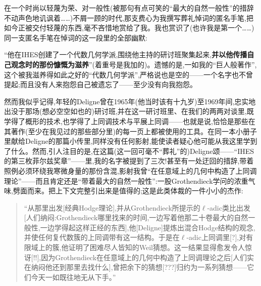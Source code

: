 在一个时尚以轻蔑为荣、对一般性(被那句有点可笑的“最大的自然一般性”的措辞不动声色地讥讽着……)不屑一顾的时代,\dmark{}那支费心为我撰写葬礼悼词的匿名手笔,把如今正被交付轻蔑的东西\dmark{},毫不吝惜地赏给了我。我也赏识了(也许我是第一个……)同一支匿名手笔在悼词的这一段里的全部幽默:

“他在IHES创建了一个代数几何学派,围绕他主持的研讨班聚集起来,\textbf{并以他传播自己观念时的那份慷慨为滋养}”(着重号是我加的)。遗憾的是,一如我的“巨人般著作”,这个被我滋养得如此之好的“代数几何学派”,严格说也是空的——一个名字也不曾提起;而且没有人来抱怨自己被遗忘了——至少没有向我抱怨。

然而我似乎记得,年轻的Deligne曾在1965年(他当时该有十九岁)至1969年间,忠实地出没于那场(想必空空如也的)研讨班,并在这一研讨班里、在我们的两两对谈里,既学得了概形的技术,也学得了上同调技术与平展上同调——也就是说,恰恰是那些在其著作(至少在我见过的那些部分里)的每一页上都被使用的工具。在同一本小册子里献给Deligne的那篇小传里,同样没有任何影射,能使读者疑心\dmark{}他可能从我这里学到了什么。然而,引人注目的是,在这篇(这一回可毫不“葬礼”的)Deligne颂——“IHES的第三枚菲尔兹奖章”——里,我的名字被提到了三次!甚至有一处迂回的措辞,带着照例必须环绕我寒微身量的那份含混,影射我曾“在任意域上的几何中构造了上同调理论”——而且肯定还是“带着最大的自然一般性”:一股Grothendieck学问的浓重气味,劈面而来。把上下文完整引出来是值得的;这是此类体裁的一件小小的杰作:

\begin{quote}
“从那里出发[经典Hodge理论],并从Grothendieck所提示的$\ell$-adic类比出发[人们纳闷:Grothendieck哪里找来的时间,一边写着他那二十卷最大的自然一般性,一边学得起这样正经的东西],他[Deligne]提炼出混合Hodge结构的观念,并使任何复代数簇的上同调带有这一结构。于是在$\ell$-adic上同调里[?],对有限域上的簇,他证明了困难尽人皆知的Weil猜想。这一结果显得愈发令人惊讶[!!],因为Grothendieck在任意域上的几何中构造了上同调理论之后[人们实在纳闷他还到那里去找什么],曾把余下的猜想[???]归约为一系列猜想——它们今天一如既往地无从下手。”
\end{quote}

